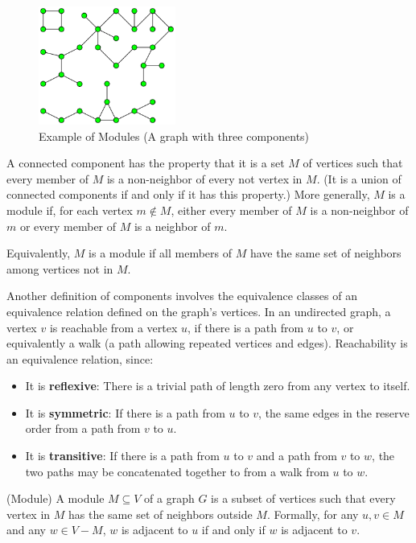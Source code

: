 \begin{figure}[!h]
    \centering
    \includegraphics[width=0.40\textwidth]{images/graphs/Pseudoforest}
    \caption{Example of Modules (A graph with three components)}
    \label{fig:example-modules}
\end{figure}

A connected component has the property that it is a set $M$ of vertices such that every member of $M$ is a non-neighbor of every not vertex in $M$.
(It is a union of connected components if and only if it has this property.)
More generally, $M$ is a module if, for each vertex $m \notin M$, either every member of $M$ is a non-neighbor of $m$ or every member of $M$ is a neighbor of $m$.

Equivalently, $M$ is a module if all members of $M$ have the same set of neighbors among vertices not in $M$.

Another definition of components involves the equivalence classes of an equivalence relation defined on the graph's vertices.
In an undirected graph, a vertex $v$ is reachable from a vertex $u$, if there is a path from $u$ to $v$, or equivalently a walk (a path allowing repeated vertices and edges).
Reachability is an equivalence relation, since:
\begin{itemize}
    \item It is \textbf{reflexive}: There is a trivial path of length zero from any vertex to itself.
    \item It is \textbf{symmetric}: If there is a path from $u$ to $v$, the same edges in the reserve order from a path from $v$ to $u$.
    \item It is \textbf{transitive}: If there is a path from $u$ to $v$ and a path from $v$ to $w$, the two paths may be concatenated together to from a walk from $u$ to $w$.
\end{itemize}

\begin{mydef}
(Module)
    A module $M \subseteq V$ of a graph $G$ is a subset of vertices such that every vertex in $M$ has the same set of neighbors outside $M$.
    Formally, for any $u, v \in M$ and any $w \in V - M$, $w$ is adjacent to $u$ if and only if $w$ is adjacent to $v$.
\end{mydef}


